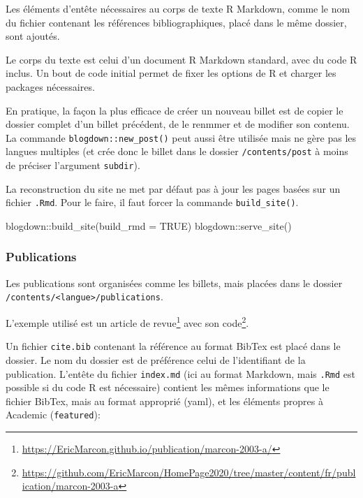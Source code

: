 \documentclass[
  11pt,
  french,
  a4paper,
  extrafontsizes,onecolumn,openright
  ]{memoir}
\newenvironment{Shaded}{\begin{snugshade}}{\end{snugshade}}
\newcommand{\AttributeTok}[1]{\textcolor[rgb]{0.77,0.63,0.00}{#1}}
\newcommand{\ConstantTok}[1]{\textcolor[rgb]{0.00,0.00,0.00}{#1}}
\newcommand{\FunctionTok}[1]{\textcolor[rgb]{0.00,0.00,0.00}{#1}}
\newcommand{\NormalTok}[1]{#1}
\newcommand{\SpecialCharTok}[1]{\textcolor[rgb]{0.00,0.00,0.00}{#1}}
\begin{document}
Les éléments d'entête nécessaires au corps de texte R Markdown, comme le nom du fichier contenant les références bibliographiques, placé dans le même dossier, sont ajoutés.

Le corps du texte est celui d'un document R Markdown standard, avec du code R inclus.
Un bout de code initial permet de fixer les options de R et charger les packages nécessaires.

En pratique, la façon la plus efficace de créer un nouveau billet est de copier le dossier complet d'un billet précédent, de le renmmer et de modifier son contenu.
La commande \texttt{blogdown::new\_post()} peut aussi être utilisée mais ne gère pas les langues multiples (et crée donc le billet dans le dossier \texttt{/contents/post} à moins de préciser l'argument \texttt{subdir}).

La reconstruction du site ne met par défaut pas à jour les pages basées sur un fichier \texttt{.Rmd}.
Pour le faire, il faut forcer la commande \texttt{build\_site()}.

\scriptsize

\begin{Shaded}
\begin{Highlighting}[]
\NormalTok{blogdown}\SpecialCharTok{::}\FunctionTok{build\_site}\NormalTok{(}\AttributeTok{build\_rmd =} \ConstantTok{TRUE}\NormalTok{)}
\NormalTok{blogdown}\SpecialCharTok{::}\FunctionTok{serve\_site}\NormalTok{()}
\end{Highlighting}
\end{Shaded}

\normalsize

\hypertarget{publications}{%
\subsubsection{Publications}\label{publications}}

Les publications sont organisées comme les billets, mais placées dans le dossier \texttt{/contents/\textless{}langue\textgreater{}/publications}.

L'exemple utilisé est un article de revue\footnote{\url{https://EricMarcon.github.io/publication/marcon-2003-a/}} avec son code\footnote{\url{https://github.com/EricMarcon/HomePage2020/tree/master/content/fr/publication/marcon-2003-a}}.

Un fichier \texttt{cite.bib} contenant la référence au format BibTex est placé dans le dossier.
Le nom du dossier est de préférence celui de l'identifiant de la publication.
L'entête du fichier \texttt{index.md} (ici au format Markdown, mais \texttt{.Rmd} est possible si du code R est nécessaire) contient les mêmes informations que le fichier BibTex, mais au format approprié (yaml), et les éléments propres à Academic (\texttt{featured}):
\end{document}
